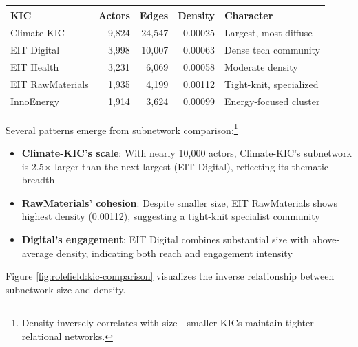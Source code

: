 \documentclass[../main.tex]{subfiles}
\begin{document}
\begin{center}
\small
\begin{tabular}{lrrrl}
\toprule
\textbf{KIC} & \textbf{Actors} & \textbf{Edges} & \textbf{Density} & \textbf{Character} \\
\midrule
Climate-KIC & 9,824 & 24,547 & 0.00025 & Largest, most diffuse \\
EIT Digital & 3,998 & 10,007 & 0.00063 & Dense tech community \\
EIT Health & 3,231 & 6,069 & 0.00058 & Moderate density \\
EIT RawMaterials & 1,935 & 4,199 & 0.00112 & Tight-knit, specialized \\
InnoEnergy & 1,914 & 3,624 & 0.00099 & Energy-focused cluster \\
\bottomrule
\end{tabular}
\end{center}

Several patterns emerge from subnetwork comparison:\footnote{Density inversely correlates with size---smaller KICs maintain tighter relational networks.}

\begin{itemize}
    \item \textbf{Climate-KIC's scale}: With nearly 10,000 actors, Climate-KIC's subnetwork is 2.5$\times$ larger than the next largest (EIT Digital), reflecting its thematic breadth
    \item \textbf{RawMaterials' cohesion}: Despite smaller size, EIT RawMaterials shows highest density (0.00112), suggesting a tight-knit specialist community
    \item \textbf{Digital's engagement}: EIT Digital combines substantial size with above-average density, indicating both reach and engagement intensity
\end{itemize}

Figure \ref{fig:rolefield:kic-comparison} visualizes the inverse relationship between subnetwork size and density.
\end{document}
